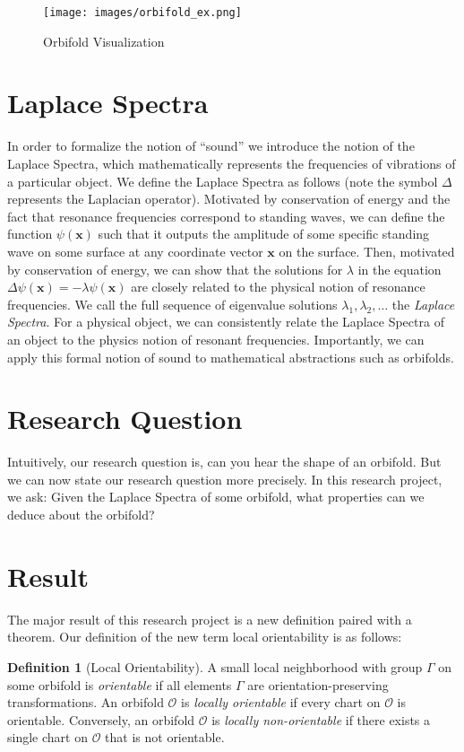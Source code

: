 \documentclass{article}[12pt]
\theoremstyle{definition}
\newtheorem{definition}[theorem]{Definition}
\begin{document}
\begin{figure}
\centering
\texttt{[image: images/orbifold\_ex.png]}
\caption{Orbifold Visualization}
\label{fig:orb}
\end{figure}

\section{Laplace Spectra}
In order to formalize the notion of ``sound'' we introduce the notion of
the Laplace Spectra, which mathematically represents the frequencies of
vibrations of a particular object. We define the Laplace Spectra as
follows (note the symbol $\Delta$ represents the Laplacian operator).
Motivated by conservation of energy and the fact that resonance frequencies
correspond to standing waves, we can define the function $\psi(\mathbf{x})$
such that it outputs the amplitude of some specific standing wave on some
surface at any coordinate vector $\mathbf{x}$ on the surface.  Then,
motivated by conservation of energy, we can show that the solutions for
$\lambda$ in the equation $\Delta \psi(\mathbf{x}) = -\lambda
\psi(\mathbf{x})$ are closely related to the physical notion of resonance
frequencies. We call the full sequence of eigenvalue solutions $\lambda_1,
\lambda_2, \dots$ the \emph{Laplace Spectra}. For a physical object, we can
consistently relate the Laplace Spectra of an object to the physics notion
of resonant frequencies. Importantly, we can apply this formal notion of
sound to mathematical abstractions such as orbifolds.

\section{Research Question}
Intuitively, our research question is, can you hear the shape of an
orbifold.  But we can now state our research question more precisely. In
this research project, we ask: Given the Laplace Spectra of some orbifold,
what properties can we deduce about the orbifold?

\section{Result}

The major result of this research project is a new definition paired with a
theorem. Our definition of the new term local orientability is as follows:

\begin{definition}[Local Orientability]
A small local neighborhood with group $\Gamma$ on some orbifold is \emph{orientable} if 
all elements $\Gamma$ are orientation-preserving transformations. An
orbifold $\mathcal{O}$ is \emph{locally orientable} if every chart on
$\mathcal{O}$ is orientable.  Conversely, an orbifold $\mathcal{O}$ is
\emph{locally non-orientable} if there exists a single chart on
$\mathcal{O}$ that is not orientable.
\end{definition}
\end{document}
